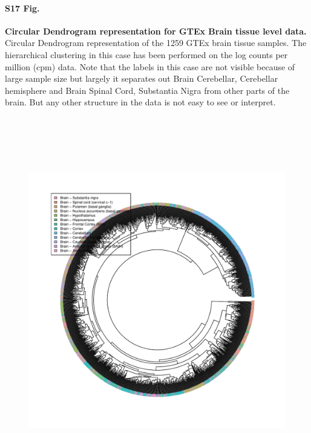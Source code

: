 \documentclass[10pt,letterpaper]{article}
\begin{document}
\paragraph*{S17 Fig.}

\label{figS17}
{\bf Circular Dendrogram representation for GTEx Brain tissue level data.} Circular Dendrogram representation of the 1259 GTEx brain tissue samples.
The hierarchical clustering in this case has been performed on the log counts per million (cpm) data.
Note that the labels in this case are not visible because of large sample size but largely it separates out
Brain Cerebellar, Cerebellar hemisphere  and Brain Spinal Cord, Substantia Nigra from other parts of the brain. But any other structure in the data is not easy to see or interpret.
\begin{figure}[ht]
\centering
\includegraphics[height=6.3in, width=6in]{../../plots/dendextend_gtex_brain_circle.pdf}
\end{figure}
\end{document}
